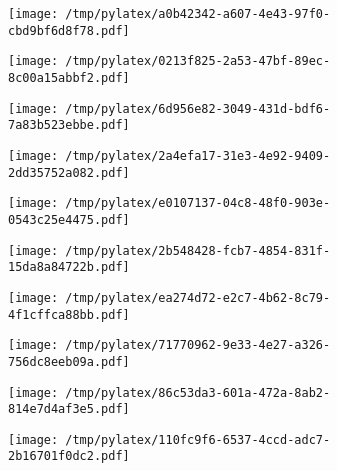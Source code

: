 \documentclass{article}
\begin{document}
\begin{figure}[htbp]
\begin{subfigure}[b]{.3\linewidth}
\texttt{[image: /tmp/pylatex/a0b42342-a607-4e43-97f0-cbd9bf6d8f78.pdf]}
\end{subfigure}
\begin{subfigure}[b]{.3\linewidth}
\texttt{[image: /tmp/pylatex/0213f825-2a53-47bf-89ec-8c00a15abbf2.pdf]}
\end{subfigure}
\begin{subfigure}[b]{.3\linewidth}
\texttt{[image: /tmp/pylatex/6d956e82-3049-431d-bdf6-7a83b523ebbe.pdf]}
\end{subfigure}
\begin{subfigure}[b]{.3\linewidth}
\texttt{[image: /tmp/pylatex/2a4efa17-31e3-4e92-9409-2dd35752a082.pdf]}
\end{subfigure}
\begin{subfigure}[b]{.3\linewidth}
\texttt{[image: /tmp/pylatex/e0107137-04c8-48f0-903e-0543c25e4475.pdf]}
\end{subfigure}
\begin{subfigure}[b]{.3\linewidth}
\texttt{[image: /tmp/pylatex/2b548428-fcb7-4854-831f-15da8a84722b.pdf]}
\end{subfigure}
\begin{subfigure}[b]{.3\linewidth}
\texttt{[image: /tmp/pylatex/ea274d72-e2c7-4b62-8c79-4f1cffca88bb.pdf]}
\end{subfigure}
\begin{subfigure}[b]{.3\linewidth}
\texttt{[image: /tmp/pylatex/71770962-9e33-4e27-a326-756dc8eeb09a.pdf]}
\end{subfigure}
\begin{subfigure}[b]{.3\linewidth}
\texttt{[image: /tmp/pylatex/86c53da3-601a-472a-8ab2-814e7d4af3e5.pdf]}
\end{subfigure}
\begin{subfigure}[b]{.3\linewidth}
\texttt{[image: /tmp/pylatex/110fc9f6-6537-4ccd-adc7-2b16701f0dc2.pdf]}
\end{subfigure}
\end{figure}
\end{document}
